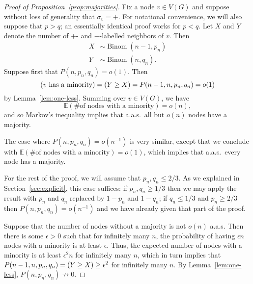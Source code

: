 \documentclass[EJP]{ejpecp}
\newcommand{\E}{\mathbb{E}}
\newcommand{\1}[1]{\mathbbm{1}_{\{#1\}}}
\let\Pr\relax
\DeclareMathOperator{\Pr}{Pr}
\DeclareMathOperator{\Binom}{Binom}
\begin{document}
\begin{proof}[Proof of Proposition~\ref{prop:majorities}]
  Fix a node $v \in V(G)$ and suppose without loss of generality
  that $\sigma_v = +$. For notational convenience, we will also suppose
  that $p > q$; an essentially identical proof works for $p < q$.
  Let $X$ and $Y$ denote the number of $+$- and $-$-labelled neighbors
  of $v$.
  Then
  \begin{align*}
   X &\sim \Binom(n-1, p_n) \\
   Y &\sim \Binom(n, q_n).
  \end{align*}
  Suppose first that $P(n, p_n, q_n) = o(1)$. Then
  \[
   \Pr(\text{$v$ has a minority}) = \Pr(Y \ge X) = P(n-1, n, p_n, q_n) = o(1)
  \]
  by Lemma~\ref{lem:one-less}.
  Summing over $v \in V(G)$, we have
  \[
   \E(\text{\# of nodes with a minority}) = o(n),
  \]
  and so Markov's inequality implies that a.a.s.\ all but $o(n)$ nodes
  have a majority.

  The case where $P(n, p_n, q_n) = o(n^{-1})$ is very similar, except that
  we conclude with
  $\E(\text{\# of nodes with a minority}) = o(1)$,
  which implies that a.a.s.\ every node has a majority.

  For the rest of the proof, we will assume that $p_n, q_n \le 2/3$. As
  we explained in Section~\ref{sec:explicit}, this case suffices: if
  $p_n, q_n \ge 1/3$ then we may apply the result with $p_n$
  and $q_n$ replaced by $1-p_n$ and $1 - q_n$; if $q_n \le 1/3$ and
  $p_n \ge 2/3$ then $P(n, p_n, q_n) = o(n^{-1})$ and we have already
  given that part of the proof.

  Suppose that the number of nodes without a majority is not $o(n)$ a.a.s.
  Then there is some $\epsilon > 0$ such that for infinitely many $n$,
  the probability of having $\epsilon n$ nodes with a minority is at least
  $\epsilon$. Thus, the expected number of nodes with a minority is at least
  $\epsilon^2 n$ for infinitely many $n$, which in turn implies that
  $P(n-1, n, p_n, q_n) = \Pr(Y \ge X) \ge \epsilon^2$ for infinitely many $n$. By
  Lemma~\ref{lem:one-less}, $P(n, p_n, q_n) \not \to 0$.


\end{proof}
\end{document}
